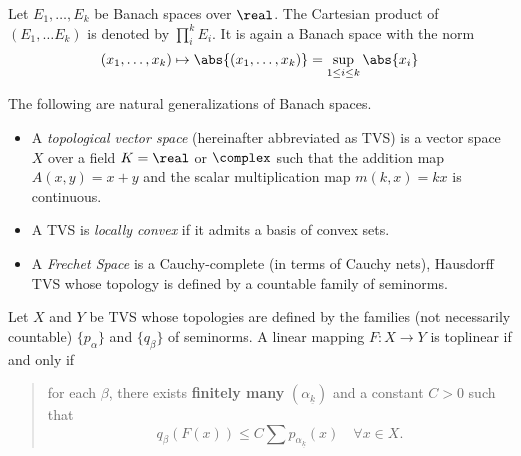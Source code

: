 \documentclass[../main-v2-manifolds.tex]{subfiles}
\begin{document}
\begin{definition}\label{def:finite-product-banach-space}
    Let $E_1,\ldots, E_k$ be Banach spaces over $\real$. The Cartesian product of $(E_1,\ldots E_k)$ is denoted by $\prod_i^k E_i$. It is again a Banach space with the norm
    \begin{equation}\label{eq:finite-product-banach-space-norm}
        (x_1,\ldots, x_k)\mapsto \abs{(x_1,\ldots, x_k)} = \sup_{1 \leq i\leq k}\abs{x_i}
    \end{equation}
\end{definition}

The following are natural generalizations of Banach spaces.
\begin{itemize}
    \item A \emph{topological vector space} (hereinafter abbreviated as TVS) is a vector space $X$ over a field $K = \real$ or $\complex$ such that the addition map $A(x,y) = x+y$ and the scalar multiplication map $m(k,x) = kx$ is continuous.
    \item A TVS is \emph{locally convex} if it admits a basis of convex sets.
    \item A \emph{Frechet Space} is a Cauchy-complete (in terms of Cauchy nets), Hausdorff TVS whose topology is defined by a countable family of seminorms.
\end{itemize}
Let $X$ and $Y$ be TVS whose topologies are defined by the families (not necessarily countable) $\{p_{\alpha}\}$ and $\{q_\beta\}$ of seminorms. A linear mapping $F:X\to Y$ is toplinear if and only if 
\begin{quote}
    for each $\beta$, there exists \textbf{finitely many} $(\alpha_{\underline{k}})$ and a constant $C>0$ such that 
    \[
        q_\beta(F(x))\leq C\sum p_{\alpha_{\underline{k}}}(x)\quad\forall x\in X.
    \]
\end{quote}


\end{document}
